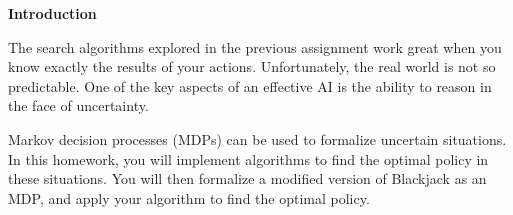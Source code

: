 {\bf Introduction}

The search algorithms explored in the previous assignment work great when you
know exactly the results of your actions.  Unfortunately, the real world is not
so predictable.  One of the key aspects of an effective AI is the ability to
reason in the face of uncertainty.

Markov decision processes (MDPs) can be used to formalize uncertain situations.
In this homework, you will implement algorithms to find the optimal policy in
these situations. You will then formalize a modified version of Blackjack as an
MDP, and apply your algorithm to find the optimal policy.